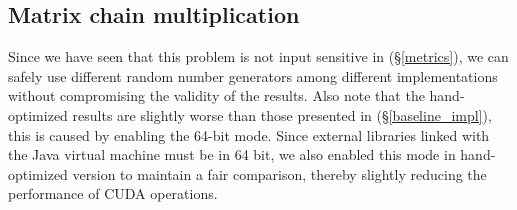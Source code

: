 \def\hh{\normalsize\bf}
\def\hl#1#2{\begin{minipage}{3.5cm} {\bf #1} \\[-2pt] \footnotesize #2 \vspace{6pt} \end{minipage}}
\def\hdps{\hl{DynaProg}{Scala parsers}}
\def\hdpc{\hl{DynaProg}{CUDA parsers}}
\def\hhoc{\hl{Optimized}{C, single thread}}
\def\hhog{\hl{Optimized}{CUDA, 64-bit}}
\def\hgapc{\hl{GAPC}{\cite{gapc_thesis}, C, single thread}}
\def\hatlp{\hl{ATLP}{\cite{gpu_atlp}, rescaled results$^{(1)}$}}
\def\hcua{\hl{CUDAlign}{\cite{swat_linear}, version 2.0}}

\def\hvien{\hl{ViennaRNA}{\cite{vienna_rna}}}
\def\hrna{\hl{RNAFold}{\cite{gpu_rnafold}}}

\newpage
\subsection{Matrix chain multiplication}
Since we have seen that this problem is not input sensitive in (\S\ref{metrics}), we can safely use different random number generators among different implementations without compromising the validity of the results.  Also note that the hand-optimized results are slightly worse than those presented in (\S\ref{baseline_impl}), this is caused by enabling the 64-bit mode. Since external libraries linked with the Java virtual machine must be in 64 bit, we also enabled this mode in hand-optimized version to maintain a fair comparison, thereby slightly reducing the performance of CUDA operations.

